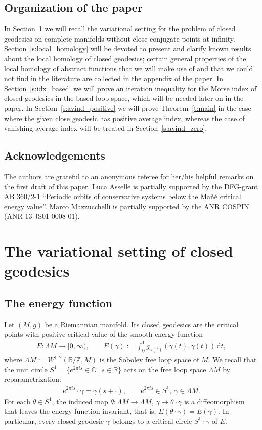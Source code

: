 \documentclass[reqno]{amsart}
\numberwithin{equation}{section}
\theoremstyle{personal}%
\theoremstyle{definition}
\newcommand{\Z}{\mathds{Z}}
\newcommand{\R}{\mathds{R}}
\newcommand{\C}{\mathds{C}}
\newcommand{\diff}{\mathrm{d}}
\begin{document}
\subsection{Organization of the paper} 
In Section~\ref{s:setting} we will recall the variational setting for the problem of closed geodesics on complete manifolds without close conjugate points at infinity. Section~\ref{s:local_homology} will be devoted to present and clarify known results about the local homology of closed geodesics; certain general properties of the local homology of abstract functions that we will make use of and that we could not find in the literature are collected in the appendix of the paper. In Section~\ref{s:idx_based} we will prove an iteration inequality for the Morse index of closed geodesics in the based loop space, which will be needed later on in the paper. In Section~\ref{s:avind_positive} we will prove Theorem~\ref{t:main} in the case where the given close geodesic has positive average index, whereas the case of vanishing average index will be treated in Section~\ref{s:avind_zero}.




\subsection{Acknowledgements}
The authors are grateful to an anonymous referee for her/his helpful remarks on the first draft of this paper.  Luca Asselle is partially supported by the DFG-grant AB 360/2-1 ``Periodic orbits of conservative systems below the Ma\~n\'e critical energy value''. Marco Mazzucchelli is partially supported by the ANR COSPIN (ANR-13-JS01-0008-01).


\section{The variational setting of closed geodesics}
\label{s:setting}

\subsection{The energy function}

Let $(M,g)$ be a Riemannian manifold. Its closed geodesics are the critical points with positive critical value of the smooth energy function
\begin{align*}
E:\Lambda M\to[0,\infty),\qquad
E(\gamma):=\int_0^1 g_{\gamma(t)}(\dot\gamma(t),\dot\gamma(t))\,\diff t,
\end{align*}
where $\Lambda M:=W^{1,2}(\R/\Z,M)$ is the Sobolev free loop space of $M$. We recall that the unit circle $S^1=\{e^{2\pi is}\in\C\ |\ s\in\R\}$ acts on the free loop space $\Lambda M$ by reparametrization:
\begin{align*}
e^{2\pi is}\cdot\gamma = \gamma(s+\cdot),\qquad
e^{2\pi is}\in S^1,\ \gamma\in\Lambda M.
\end{align*}
For each $\theta\in S^1$, the induced map $\theta:\Lambda M\to\Lambda M$, $\gamma\mapsto\theta\cdot\gamma$ is a diffeomorphism that leaves the energy function invariant, that is, $E(\theta\cdot\gamma)=E(\gamma)$. In particular, every closed geodesic $\gamma$ belongs to a critical circle $S^1\cdot\gamma$ of $E$. 
\end{document}
